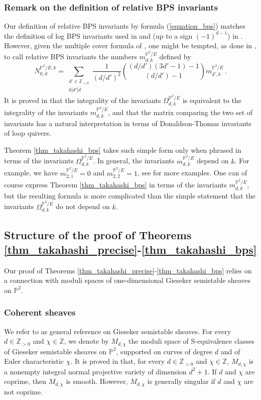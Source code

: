 \documentclass[11pt,letterpaper]{amsart}
\newcommand\PP{\mathbb P}
\newcommand\Z{\mathbb Z}
\begin{document}
\subsubsection{Remark on the definition of relative BPS invariants}
Our definition of relative BPS invariants
by formula (\ref{equation_bps})
matches the definition of log BPS invariants used in 
\cite{bousseau2018quantum_tropical} and 
(up to a sign 
$(-1)^{d-1}$)
in \cite{choi2018log}.
However, given the multiple cover formula of \cite[Proposition 6.1]{MR2667135}, 
one might be tempted, as done in \cite{MR2667135, MR3228298, gabele2019tropical}, to call relative 
BPS invariants the numbers 
$m_{d,k}^{\PP^2/E}$ defined by 
\[ N_{0,d}^{\PP^2/E,k}
=\sum_{\substack{d'\in \Z_{>0}\\
k|d'|d}}
\frac{1}{(d/d')^2} \binom{(d/d')(3d'-1)-1}{(d/d')-1} m_{d',k}^{\PP^2/E}\,.\]
It is proved in \cite{MR3228298} that 
the integrality of the invariants 
$\Omega_{d,k}^{\PP^2/E}$ is equivalent to the integrality of the invariants 
$m_{d,k}^{\PP^2/E}$, and that the matrix comparing the two set of invariants has a natural interpretation in terms of Donaldson-Thomas invariants of loop quivers. 

Theorem
\ref{thm_takahashi_bps} takes such simple form only when phrased in terms of the invariants 
$\Omega_{d,k}^{\PP^2/E}$. In general, the invariants 
$m_{d,k}^{\PP^2/E}$ depend on $k$.
For example, we have $m_{2,1}^{\PP^2/E}=0$ and $m_{2,2}^{\PP^2/E}=1$, see \cite[Table 7.1]{gabele2019tropical} for more examples. 
One can of course express Theorem \ref{thm_takahashi_bps} in terms of 
the invariants $m_{d,k}^{\PP^2/E}$, but the resulting formula is more complicated than the simple statement that the invariants $\Omega_{d,k}^{\PP^2/E}$ do not depend on $k$.



\subsection{Structure of the proof of Theorems \ref{thm_takahashi_precise}-\ref{thm_takahashi_bps}}
\label{section_structure_proof_intro}

Our proof of Theorems \ref{thm_takahashi_precise}-\ref{thm_takahashi_bps}
relies on a connection with moduli spaces of one-dimensional Gieseker semistable sheaves on
$\PP^2$. 

\subsubsection{Coherent sheaves}
We refer to \cite{huybrechts2010geometry} as general reference on Gieseker semistable sheaves. 
For every $d \in \Z_{>0}$ and $\chi \in \Z$, we denote by $M_{d,\chi}$ the moduli space of S-equivalence classes of Gieseker semistable sheaves on $\PP^2$, supported on curves of degree $d$ and of Euler characteristic $\chi$.
It is proved in \cite{MR1263210} that, for every $d \in \Z_{>0}$ and $\chi \in \Z$, $M_{d,\chi}$ is a
nonempty integral normal projective variety of dimension $d^2+1$. If $d$ and $\chi$ are coprime, then $M_{d,\chi}$ is smooth.
However, $M_{d,\chi}$ is generally singular if $d$ and $\chi$ are not coprime.
\end{document}

